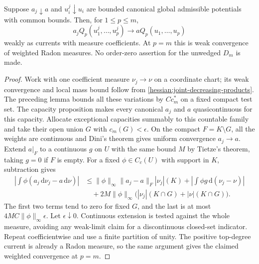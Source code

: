 \begin{theorem}\label{draft623:weighted-positive-products}
Suppose $a_j\downarrow a$ and $u_i^j\downarrow u_i$ are bounded
canonical global admissible potentials with common bounds. Then,
for $1\leq p\leq m$,
\[
 a_j Q_p(u_1^j,\ldots,u_p^j)
        \longrightarrow a Q_p(u_1,\ldots,u_p)
\]
weakly as currents with measure coefficients. At $p=m$ this is weak
convergence of weighted Radon measures. No order-zero assertion for
the unwedged $D_m$ is made.
\end{theorem}
\begin{proof}
Work with one coefficient measure $\nu_j\to\nu$ on a coordinate
chart; its weak convergence and local mass bound follow from
\cref{hessian:joint-decreasing-products}. The preceding lemma bounds
all these variations by $C c_m^*$ on a fixed compact test set.
The capacity proposition makes every canonical $a_j$ and $a$
quasicontinuous for this capacity. Allocate exceptional capacities
summably to this countable family and take their open union $G$
with $c_m(G)<\epsilon$. On the compact $F=K\setminus G$, all the
weights are continuous and Dini's theorem gives uniform convergence
$a_j\to a$. Extend $a|_F$ to a continuous $g$ on $U$ with the same
bound $M$ by Tietze's theorem, taking $g=0$ if $F$ is empty.
For a fixed $\phi\in C_c(U)$ with support in $K$, subtraction gives
\[
 \begin{split}
 \left|\int\phi(a_j\,\mathrm d\nu_j-a\,\mathrm d\nu)\right|
 &\leq\|\phi\|_\infty\|a_j-a\|_F|\nu_j|(K)
      +\left|\int\phi g\,\mathrm d(\nu_j-\nu)\right|\\
 &\quad+2M\|\phi\|_\infty
                \bigl(|\nu_j|(K\cap G)+|\nu|(K\cap G)\bigr).
 \end{split}
\]
The first two terms tend to zero for fixed $G$, and the last is at
most $4MC\|\phi\|_\infty\epsilon$. Let $\epsilon\downarrow0$.
Continuous extension is tested against the whole measure, avoiding
any weak-limit claim for a discontinuous closed-set indicator.
Repeat coefficientwise and use a finite partition of unity.
The positive top-degree current is already a Radon measure, so the
same argument gives the claimed weighted convergence at $p=m$.
\end{proof}

